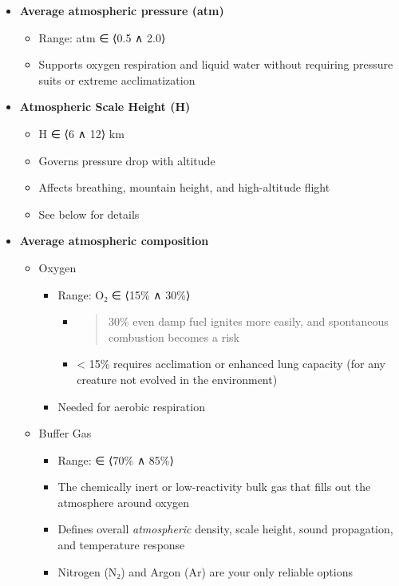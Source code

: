 \documentclass[
  letterpaper,
]{book}
\providecommand{\tightlist}{%
  \setlength{\itemsep}{0pt}\setlength{\parskip}{0pt}}
\begin{document}
\begin{itemize}
\tightlist
\item
  \textbf{Average atmospheric pressure (atm)}

  \begin{itemize}
  \tightlist
  \item
    Range: atm ∈ ⟨0.5 ∧ 2.0⟩
  \item
    Supports oxygen respiration and liquid water without requiring
    pressure suits or extreme acclimatization
  \end{itemize}
\item
  \textbf{Atmospheric Scale Height (H)}

  \begin{itemize}
  \tightlist
  \item
    H ∈ ⟨6 ∧ 12⟩ km
  \item
    Governs pressure drop with altitude
  \item
    Affects breathing, mountain height, and high-altitude flight
  \item
    See below for details
  \end{itemize}
\item
  \textbf{Average atmospheric composition}

  \begin{itemize}
  \tightlist
  \item
    Oxygen

    \begin{itemize}
    \tightlist
    \item
      Range: O₂ ∈ ⟨15\% ∧ 30\%⟩

      \begin{itemize}
      \item
        \begin{quote}
        30\% even damp fuel ignites more easily, and spontaneous
        combustion becomes a risk
        \end{quote}
      \item
        \textless{} 15\% requires acclimation or enhanced lung capacity
        (for any creature not evolved in the environment)
      \end{itemize}
    \item
      Needed for aerobic respiration
    \end{itemize}
  \item
    Buffer Gas

    \begin{itemize}
    \tightlist
    \item
      Range: ∈ ⟨70\% ∧ 85\%⟩
    \item
      The chemically inert or low-reactivity bulk gas that fills out the
      atmosphere around oxygen
    \item
      Defines overall \emph{atmospheric} density, scale height, sound
      propagation, and temperature response
    \item
      Nitrogen (N₂) and Argon (Ar) are your only reliable options


\end{itemize}
\end{itemize}
\end{itemize}
\end{document}
